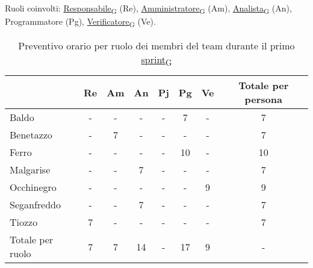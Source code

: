 \newpage
{}
Ruoli coinvolti: \href{https://7last.github.io/docs/rtb/documentazione-interna/glossario\#responsabile}{Responsabile\textsubscript{G}} (Re), \href{https://7last.github.io/docs/rtb/documentazione-interna/glossario\#amministratore}{Amministratore\textsubscript{G}} (Am), \href{https://7last.github.io/docs/rtb/documentazione-interna/glossario\#analista}{Analista\textsubscript{G}} (An), Programmatore (Pg), \href{https://7last.github.io/docs/rtb/documentazione-interna/glossario\#verificatore}{Verificatore\textsubscript{G}} (Ve).
\begin{table}[!h]
	\centering
	\begin{tabular}{ | l | c | c | c | c | c | c | c | }
		\hline
		\textbf{}        & \textbf{Re} & \textbf{Am} & \textbf{An} & \textbf{Pj} & \textbf{Pg} & \textbf{Ve} & \textbf{Totale per persona} \\
		\hline
		Baldo            & -           & -           & -           & -           & 7           & -           & 7                           \\
		Benetazzo        & -           & 7           & -           & -           & -           & -           & 7                           \\
		Ferro            & -           & -           & -           & -           & 10          & -           & 10                          \\
		Malgarise        & -           & -           & 7           & -           & -           & -           & 7                           \\
		Occhinegro       & -           & -           & -           & -           & -           & 9           & 9                           \\
		Seganfreddo      & -           & -           & 7           & -           & -           & -           & 7                           \\
		Tiozzo           & 7           & -           & -           & -           & -           & -           & 7                           \\
		\hline
		Totale per ruolo & 7           & 7           & 14          & -           & 17          & 9           & -                           \\
		\hline
	\end{tabular}
	\caption{Preventivo orario per ruolo dei membri del team durante il primo \href{https://7last.github.io/docs/rtb/documentazione-interna/glossario\#sprint}{sprint\textsubscript{G}}}
	
\end{table}

